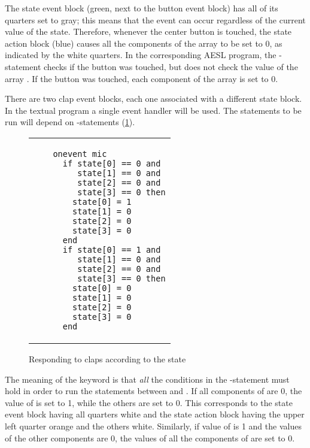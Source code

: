 The state event block (green, next to the button event block) has all of
its quarters set to gray; this means that the event can occur regardless
of the current value of the state. Therefore, whenever the center button
is touched, the state action block (blue) causes all the components of
the array  to be set to 0, as indicated by the white quarters.
In the corresponding AESL program, the -statement checks if the
button was touched, but does not check the value of the array .
If the button was touched, each component of the array is set to 0.

There are two clap event blocks, each one associated with a different
state block. In the textual program a single  event handler will
be used. The statements to be run will depend on -statements
(\cref{fig.respond}).

\begin{figure}[hbt]
\begin{center}
\begin{tabular}{ll}
\raisebox{10ex}{\texttt{[image: two-clap]}} &
\begin{minipage}[b]{.5\textwidth}
\begin{footnotesize}
\begin{verbatim}
  onevent mic
    if state[0] == 0 and
       state[1] == 0 and
       state[2] == 0 and
       state[3] == 0 then
      state[0] = 1
      state[1] = 0
      state[2] = 0
      state[3] = 0
    end
    if state[0] == 1 and
       state[1] == 0 and
       state[2] == 0 and
       state[3] == 0 then
      state[0] = 0
      state[1] = 0
      state[2] = 0
      state[3] = 0
    end
\end{verbatim}
\end{footnotesize}
\end{minipage}
\end{tabular}
\caption{Responding to claps according to the state}\label{fig.respond}
\end{center}
\end{figure}

The meaning of the keyword  is that \emph{all} the conditions in
the -statement must hold in order to run the statements between
 and . If all components of  are 0, the value of
 is set to 1, while the others are set to 0. This
corresponds to the state event block having all quarters white and the
state action block having the upper left quarter orange and the others
white. Similarly, if value of  is 1 and the values of the
other components are 0, the values of all the components of 
are set to 0.

